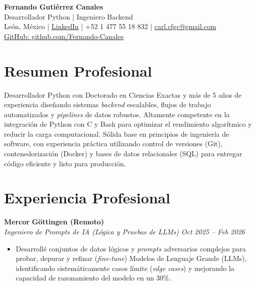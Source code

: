 \documentclass[10pt,a4paper]{article}
\begin{document}
\begin{center}
    {\Huge \textbf{Fernando Gutiérrez Canales}}\\
    {\Large Desarrollador Python | Ingeniero Backend}\\    
    León, México \quad | \quad \href{https://www.linkedin.com/in/fernando-guti\%C3\%A9rrez-canales-804876343/}{LinkedIn} \quad | \quad +52 1 477 55 18 832 \quad | \quad \href{mailto:carl.cfgc@gmail.com}{carl.cfgc@gmail.com} \\
     \href{https://github.com/Fernando-Canales}{GitHub: github.com/Fernando-Canales}
\end{center}

\vspace{1em}

\section*{Resumen Profesional}
Desarrollador Python con Doctorado en Ciencias Exactas y más de 5 años de experiencia diseñando sistemas \textit{backend} escalables, flujos de trabajo automatizados y \textit{pipelines} de datos robustos. Altamente competente en la integración de Python con C y Bash para optimizar el rendimiento algorítmico y reducir la carga computacional. Sólida base en principios de ingeniería de software, con experiencia práctica utilizando control de versiones (Git), contenedorización (Docker) y bases de datos relacionales (SQL) para entregar código eficiente y listo para producción.

\section*{Experiencia Profesional}
\textbf{Mercor} \hfill \textbf{Göttingen (Remoto)} \\
\textit{Ingeniero de Prompts de IA (Lógica y Pruebas de LLMs)} \hfill \textit{Oct 2025 -- Feb 2026}
\begin{itemize}[leftmargin=1.5em]
	\item Desarrollé conjuntos de datos lógicos y \textit{prompts} adversarios complejos para probar, depurar y refinar (\textit{fine-tune}) Modelos de Lenguaje Grande (LLMs), identificando sistemáticamente casos límite (\textit{edge cases}) y mejorando la capacidad de razonamiento del modelo en un 30\%.
\end{itemize}
\end{document}
